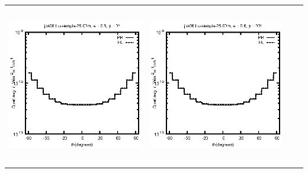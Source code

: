 \documentclass[10pt,a4paper]{article}
\begin{document}
\begin{adjustwidth}{-1.2in}{-1.2in}
\begin{tabular}{c c c c}
\includegraphics[height=7cm]{../eps/jok06_Lu_sample_25.00m_fwd.eps} &
\includegraphics[height=7cm]{../eps/jok06_Lu_sample_25.00m_cross.eps} \\
\end{tabular}

\pagebreak


\end{adjustwidth}
\end{document}
